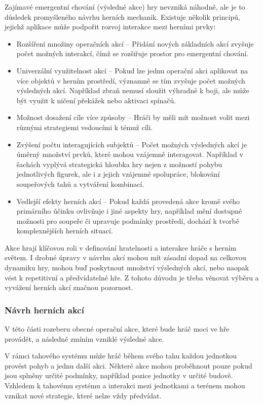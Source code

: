 Zajímavé emergentní chování (výsledné akce) hry nevzniká náhodně, ale je to důsledek promyšleného návrhu herních mechanik. Existuje několik principů, jejichž aplikace může podpořit rozvoj interakce mezi herními prvky:

\begin{itemize}
    \item Rozšíření množiny operačních akcí -- Přidání nových základních akcí zvyšuje počet možných interakcí, čímž se rozšiřuje prostor pro emergentní chování.
    \item Univerzální využitelnost akcí -- Pokud lze jednu operační akci aplikovat na více objektů v herním prostředí, významně se tím zvyšuje počet možných výsledných akcí. Například zbraň nemusí sloužit výhradně k boji, ale může být využit k ničení překážek nebo aktivaci spínačů.
    \item Možnost dosažení cíle více způsoby – Hráči by měli mít možnost volit mezi různými strategiemi vedoucími k témuž cíli.
    \item Zvýšení počtu interagujících subjektů -- Počet možných výsledných akcí je úměrný množství prvků, které mohou vzájemně interagovat. Například v šachách vyplývá strategická hloubka hry nejen z možností pohybu jednotlivých figurek, ale i z jejich vzájemné spolupráce, blokování soupeřových tahů a vytváření kombinací.
    \item Vedlejší efekty herních akcí -- Pokud každá provedená akce kromě svého primárního účinku ovlivňuje i jiné aspekty hry, například mění dostupné možnosti pro soupeře či upravuje podmínky prostředí, dochází k tvorbě komplexnějších herních situací.
\end{itemize}

Akce hrají klíčovou roli v definování hratelnosti a interakce hráče s herním světem. I drobné úpravy v návrhu akcí mohou mít zásadní dopad na celkovou dynamiku hry, mohou buď poskytnout množství výsledných akcí, nebo naopak vést k repetitivní a předvídatelné hře. Z tohoto důvodu je třeba věnovat výběru a vyvážení herních akcí značnou pozornost.

\subsubsection{Návrh herních akcí}

V této části rozeberu obecné operační akce, které bude hráč moci ve hře provádět, a následně zmíním vzniklé výsledné akce.

V rámci tahového systému může hráč během svého tahu každou jednotkou provést pohyb a jednu další akci. Některé akce mohou proběhnout pouze pokud jsou splněny určité podmínky, například pozice jednotky v určité budově. Vzhledem k tahovému systému a interakci mezi jednotkami a terénem mohou vznikat nové strategie, které nelze vždy předvídat.

